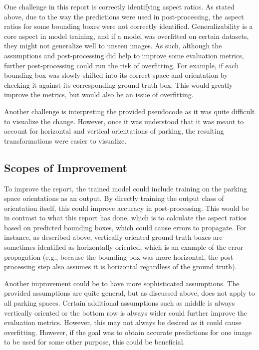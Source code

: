 \documentclass[man]{apa7}
\begin{document}
One challenge in this report is correctly identifying aspect ratios. As stated above, due to the way the predictions were used in post-processing, the aspect ratios for some bounding boxes were not correctly identified. Generalizability is a core aspect in model training, and if a model was overfitted on certain datasets, they might not generalize well to unseen images. As such, although the assumptions and post-processing did help to improve some evaluation metrics, further post-processing could run the risk of overfitting. For example, if each bounding box was slowly shifted into its correct space and orientation by checking it against its corresponding ground truth box. This would greatly improve the metrics, but would also be an issue of overfitting.

Another challenge is interpreting the provided pseudocode as it was quite difficult to visualize the change. However, once it was understood that it was meant to account for horizontal and vertical orientations of parking, the resulting transformations were easier to visualize. 

\subsection{Scopes of Improvement}

To improve the report, the trained model could include training on the parking space orientations as an output. By directly training the output class of orientation itself, this could improve accuracy in post-processing. This would be in contrast to what this report has done, which is to calculate the aspect ratios based on predicted bounding boxes, which could cause errors to propagate. For instance, as described above, vertically oriented ground truth boxes are sometimes identified as horizontally oriented, which is an example of the error propagation (e.g., because the bounding box was more horizontal, the post-processing step also assumes it is horizontal regardless of the ground truth).

Another improvement could be to have more sophisticated assumptions. The provided assumptions are quite general, but as discussed above, does not apply to all parking spaces. Certain additional assumptions such as middle is always vertically oriented or the bottom row is always wider could further improve the evaluation metrics. However, this may not always be desired as it could cause overfitting. However, if the goal was to obtain accurate predictions for one image to be used for some other purpose, this could be beneficial.
\end{document}
